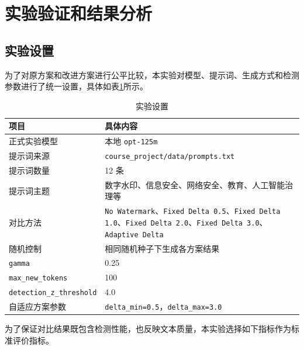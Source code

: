 \documentclass{SYSUReport}
\begin{document}
\section{实验验证和结果分析}

\subsection{实验设置}

为了对原方案和改进方案进行公平比较，本实验对模型、提示词、生成方式和检测参数进行了统一设置，具体如表\ref{tab:setup}所示。

\begin{table}[H]
    \centering
    \caption{实验设置}
    \label{tab:setup}
    \begin{tabularx}{0.92\textwidth}{>{\raggedright\arraybackslash}p{} X}
        \toprule
        项目 & 具体内容 \\
        \midrule
        正式实验模型 & 本地 \texttt{opt-125m} \\
        提示词来源 & \texttt{course\_project/data/prompts.txt} \\
        提示词数量 & 12 条 \\
        提示词主题 & 数字水印、信息安全、网络安全、教育、人工智能治理等 \\
        对比方法 & \texttt{No Watermark}、\texttt{Fixed Delta 0.5}、\texttt{Fixed Delta 1.0}、\texttt{Fixed Delta 2.0}、\texttt{Fixed Delta 3.0}、\texttt{Adaptive Delta} \\
        随机控制 & 相同随机种子下生成各方案结果 \\
        \texttt{gamma} & 0.25 \\
        \texttt{max\_new\_tokens} & 100 \\
        \texttt{detection\_z\_threshold} & 4.0 \\
        自适应方案参数 & \texttt{delta\_min=0.5}，\texttt{delta\_max=3.0} \\
        \bottomrule
    \end{tabularx}
\end{table}

为了保证对比结果既包含检测性能，也反映文本质量，本实验选择如下指标作为标准评价指标。
\end{document}

